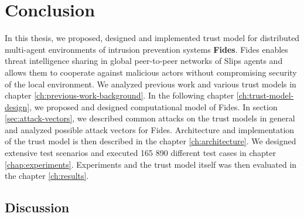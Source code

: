 \chapter{Conclusion}
\label{ch:conclusion}
In this thesis, we proposed, designed and implemented trust model for distributed multi-agent environments of intrusion prevention systems \textbf{Fides}.
Fides enables threat intelligence sharing in global peer-to-peer networks of Slips agents and allows them to cooperate against malicious actors without compromising security of the local environment. 
We analyzed previous work and various trust models in chapter \ref{ch:previous-work-background}.
In the following chapter \ref{ch:trust-model-design}, we proposed and designed computational model of Fides.
In section \ref{sec:attack-vectors}, we described common attacks on the trust models in general and analyzed possible attack vectors for Fides.
Architecture and implementation of the trust model is then described in the chapter \ref{ch:architecture}.
We designed extensive test scenarios and executed 165 890 different test cases in chapter \ref{chap:experiments}.
Experiments and the trust model itself was then evaluated in the chapter \ref{ch:results}.


\section{Discussion}
\label{sec:discussion}


